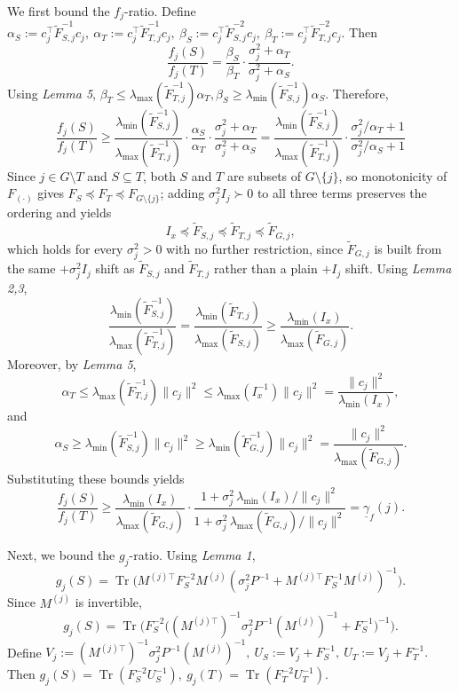 \documentclass[letterpaper, 10 pt, conference]{ieeeconf}  %
\begin{document}
\noindent We first bound the \(f_j\)-ratio. Define
$
\alpha_S:=c_j^\top \widetilde F_{S,j}^{-1}c_j, \ \alpha_T:=c_j^\top \widetilde F_{T,j}^{-1}c_j, \ \beta_S:=c_j^\top \widetilde F_{S,j}^{-2}c_j, \ \beta_T:=c_j^\top \widetilde F_{T,j}^{-2}c_j.
$
Then
\[
\frac{f_j(S)}{f_j(T)}
=
\frac{\beta_S}{\beta_T}
\cdot
\frac{\sigma_j^2+\alpha_T}{\sigma_j^2+\alpha_S}.
\]
Using \textit{Lemma 5},
$
\beta_T
\le
\lambda_{\max}(\widetilde F_{T,j}^{-1})\alpha_T, \beta_S
\ge
\lambda_{\min}(\widetilde F_{S,j}^{-1})\alpha_S.
$
Therefore,
\[
\frac{f_j(S)}{f_j(T)} \!
\ge \!
\frac{\lambda_{\min}(\widetilde F_{S,j}^{-1})}{\lambda_{\max}(\widetilde F_{T,j}^{-1})}
\cdot
\frac{\alpha_S}{\alpha_T}
\cdot
\frac{\sigma_j^2+\alpha_T}{\sigma_j^2+\alpha_S}
=
\frac{\lambda_{\min}(\widetilde F_{S,j}^{-1})}{\lambda_{\max}(\widetilde F_{T,j}^{-1})}
\cdot
\frac{\sigma_j^2/\alpha_T+1}{\sigma_j^2/\alpha_S+1}
\]
Since \(j\in G\setminus T\) and \(S\subseteq T\), both \(S\) and \(T\) are subsets of \(G\setminus\{j\}\), so monotonicity of \(F_{(\cdot)}\) gives \(F_S\preceq F_T\preceq F_{G\setminus\{j\}}\); adding \(\sigma_j^2 I_j\succ 0\) to all three terms preserves the ordering and yields
\[
I_x \preceq \widetilde F_{S,j}\preceq \widetilde F_{T,j}\preceq \widetilde F_{G,j},
\]
which holds for every \(\sigma_j^2>0\) with no further restriction, since \(\widetilde F_{G,j}\) is built from the same \(+\sigma_j^2 I_j\) shift as \(\widetilde F_{S,j}\) and \(\widetilde F_{T,j}\) rather than a plain \(+I_j\) shift. Using \textit{Lemma 2,3},
\[
\frac{\lambda_{\min}(\widetilde F_{S,j}^{-1})}{\lambda_{\max}(\widetilde F_{T,j}^{-1})}
=
\frac{\lambda_{\min}(\widetilde F_{T,j})}{\lambda_{\max}(\widetilde F_{S,j})}
\ge
\frac{\lambda_{\min}(I_x)}{\lambda_{\max}(\widetilde F_{G,j})}.
\]
Moreover, by \textit{Lemma 5},
\[
\alpha_T
\le
\lambda_{\max}(\widetilde F_{T,j}^{-1})\|c_j\|^2
\le
\lambda_{\max}(I_x^{-1})\|c_j\|^2
=
\frac{\|c_j\|^2}{\lambda_{\min}(I_x)},
\]
and
\[
\alpha_S
\ge
\lambda_{\min}(\widetilde F_{S,j}^{-1})\|c_j\|^2
\ge
\lambda_{\min}(\widetilde F_{G,j}^{-1})\|c_j\|^2
=
\frac{\|c_j\|^2}{\lambda_{\max}(\widetilde F_{G,j})}.
\]
Substituting these bounds yields
\begin{equation}
\label{eq:f_ratio_bound}
\frac{f_j(S)}{f_j(T)}
\ge \frac{\lambda_{\min}(I_x)}{\lambda_{\max}(\widetilde F_{G,j})}
\cdot
\frac{
1+\sigma_j^2\,\lambda_{\min}(I_x)/\|c_j\|^2
}{
1+\sigma_j^2\,\lambda_{\max}(\widetilde F_{G,j})/\|c_j\|^2
} =
\underline\gamma_f(j).
\end{equation}

\noindent Next, we bound the \(g_j\)-ratio. Using \textit{Lemma 1},
\[
g_j(S)
=
\operatorname{Tr}\!\Big(
M^{(j)\top}F_S^{-2}M^{(j)}
(\sigma_j^2P^{-1}+M^{(j)\top}F_S^{-1}M^{(j)})^{-1}
\Big).
\]
Since \(M^{(j)}\) is invertible,
\[
g_j(S)
=
\operatorname{Tr}\!\Big(
F_S^{-2}
\big((M^{(j)\top})^{-1}\sigma_j^2P^{-1}(M^{(j)})^{-1}+F_S^{-1}\big)^{-1}
\Big).
\]
Define  $V_j:=(M^{(j)\top})^{-1}\sigma_j^2P^{-1}(M^{(j)})^{-1},
\
U_S:=V_j+F_S^{-1},
\
U_T:=V_j+F_T^{-1}.$ Then $g_j(S)=\operatorname{Tr}(F_S^{-2}U_S^{-1}),
\
g_j(T)=\operatorname{Tr}(F_T^{-2}U_T^{-1}).
$ \\
\end{document}
